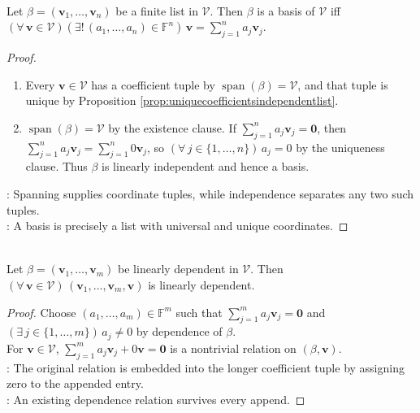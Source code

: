 \begin{proposition} \label{prop:basis-unique-coordinate-representation} \\
Let $\beta=(\mathbf{v}_1,\ldots,\mathbf{v}_n)$ be a finite list in $\mathcal{V}$. Then $\beta$ is a basis of $\mathcal{V}$ iff $(\forall\,\mathbf{v}\in\mathcal{V})(\exists!\,(a_1,\ldots,a_n)\in\mathbb{F}^n)\,\mathbf{v}=\sum\limits_{j=1}^{n}a_j\mathbf{v}_j$.
\begin{proof}
\begin{enumerate}[label=\roman*.]
\setlength{\itemsep}{0pt}
\item[$(\Rightarrow)$] Every $\mathbf{v}\in\mathcal{V}$ has a coefficient tuple by $\operatorname{span}(\beta)=\mathcal{V}$, and that tuple is unique by Proposition \ref{prop:uniquecoefficientsindependentlist}.
\item[$(\Leftarrow)$] $\operatorname{span}(\beta)=\mathcal{V}$ by the existence clause. If $\sum\limits_{j=1}^{n}a_j\mathbf{v}_j=\mathbf{0}$, then $\sum\limits_{j=1}^{n}a_j\mathbf{v}_j=\sum\limits_{j=1}^{n}0\mathbf{v}_j$, so $(\forall\,j\in\{1,\ldots,n\})\,a_j=0$ by the uniqueness clause. Thus $\beta$ is linearly independent and hence a basis.
\end{enumerate}
: Spanning supplies coordinate tuples, while independence separates any two such tuples.\\
: A basis is precisely a list with universal and unique coordinates.
\end{proof}
\end{proposition}

\begin{proposition} \label{prop:appendingtodependentlist} \\
Let $\beta=(\mathbf{v}_1,\ldots,\mathbf{v}_m)$ be linearly dependent in $\mathcal{V}$. Then $(\forall\,\mathbf{v}\in\mathcal{V})\,(\mathbf{v}_1,\ldots,\mathbf{v}_m,\mathbf{v})$ is linearly dependent.
\begin{proof}
Choose $(a_1,\ldots,a_m)\in\mathbb{F}^m$ such that $\sum\limits_{j=1}^{m}a_j\mathbf{v}_j=\mathbf{0}$ and $(\exists\,j\in\{1,\ldots,m\})\,a_j\neq0$ by dependence of $\beta$.\\
For $\mathbf{v}\in\mathcal{V}$, $\sum\limits_{j=1}^{m}a_j\mathbf{v}_j+0\mathbf{v}=\mathbf{0}$ is a nontrivial relation on $(\beta,\mathbf{v})$.\\
: The original relation is embedded into the longer coefficient tuple by assigning zero to the appended entry.\\
: An existing dependence relation survives every append.
\end{proof}
\end{proposition}


